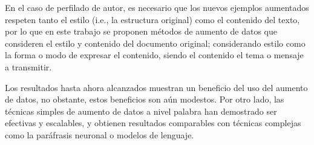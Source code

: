 En el caso de perfilado de autor, es necesario que los nuevos ejemplos aumentados respeten tanto el estilo (i.e., la estructura original) como el contenido del texto, por lo que en este trabajo se proponen métodos de aumento de datos que consideren el estilo y contenido del documento original; considerando estilo como la forma o modo de expresar el contenido, siendo el contenido el tema o mensaje a transmitir.

Los resultados hasta ahora alcanzados muestran un beneficio del uso del aumento de datos, no obstante, estos beneficios son aún modestos. Por otro lado, las técnicas simples de aumento de datos a nivel palabra han demostrado ser efectivas y escalables, y obtienen resultados comparables con técnicas complejas como la paráfrasis neuronal o modelos de lenguaje.


